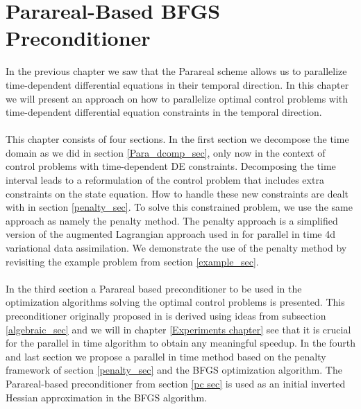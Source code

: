 \chapter{Parareal-Based BFGS Preconditioner} \label{method_chap}
In the previous chapter we saw that the Parareal scheme allows us to parallelize time-dependent differential equations in their temporal direction. In this chapter we will present an approach on how to parallelize optimal control problems with time-dependent differential equation constraints in the temporal direction. 
\\
\\
This chapter consists of four sections. In the first section we decompose the time domain as we did in section \ref{Para_dcomp_sec}, only now in the context of control problems with time-dependent DE constraints. Decomposing the time interval leads to a reformulation of the control problem that includes extra constraints on the state equation. How to handle these new constraints are dealt with in section \ref{penalty_sec}. To solve this constrained problem, we use the same approach as \cite{maday2002parareal} namely the penalty method. The penalty approach is a simplified version of the augmented Lagrangian approach used in \cite{rao2016time} for parallel in time 4d variational data assimilation. We demonstrate the use of the penalty method by revisiting the example problem from section \ref{example_sec}.
\\
\\
In the third section a Parareal based preconditioner to be used in the optimization algorithms solving the optimal control problems is presented. This preconditioner originally proposed in \cite{maday2002parareal} is derived using ideas from subsection \ref{algebraic_sec} and we will in chapter \ref{Experiments chapter} see that it is crucial for the parallel in time algorithm to obtain any meaningful speedup. In the fourth and last section we propose a parallel in time method based on the penalty framework of section \ref{penalty_sec} and the BFGS optimization algorithm. The Parareal-based preconditioner from section \ref{pc sec} is used as an initial inverted Hessian approximation in the BFGS algorithm.
